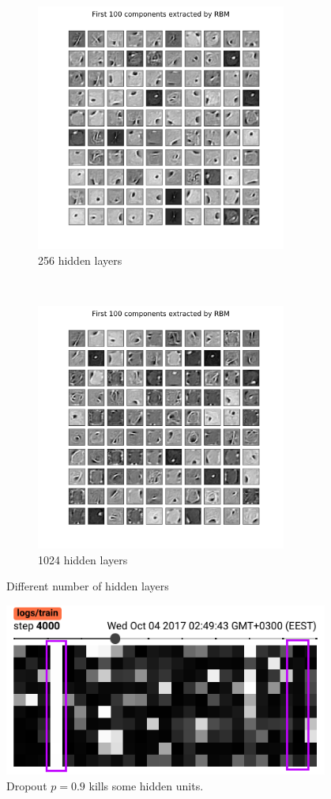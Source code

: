 \begin{figure}[t!]
\begin{mdframed}
\centering
\begin{subfigure}[t]{0.5\textwidth}
    \centering
    \includegraphics[height=3.2in]{rbm-mnist/rbm_mnist_256.png}
    \caption{256 hidden layers}
\end{subfigure}%
~
\begin{subfigure}[t]{0.5\textwidth}
    \centering
    \includegraphics[height=3.2in]{rbm-mnist/rbm_mnist_1024.png}
    \caption{1024 hidden layers}
\end{subfigure}
\caption{Different number of hidden layers}
\end{mdframed}
\end{figure}

\begin{figure}[h]
\begin{mdframed}
\centering
\includegraphics[width=4.2in]{rbm-mnist/dropout.png}
\caption{Dropout $p=0.9$ kills some hidden units.}
\end{mdframed}
\end{figure}

